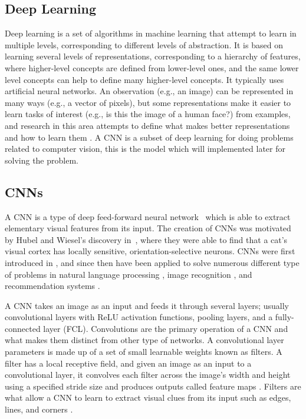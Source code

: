 \subsection{Deep Learning}
Deep learning is a set of algorithms in machine learning that attempt to learn in multiple levels, corresponding to different levels of abstraction. It is based on learning several levels of representations, corresponding to a hierarchy of features, where higher-level concepts are defined from lower-level ones, and the same lower level concepts can help to define many higher-level concepts. It typically uses artificial neural networks. An observation (e.g., an image) can be represented in many ways (e.g., a vector of pixels), but some representations make it easier to learn tasks of interest (e.g., is this the image of a human face?) from examples, and research in this area attempts to define what makes better representations and how to learn them \cite{DeepLearning}. A CNN is a subset of deep learning for doing problems related to computer vision, this is the model which will implemented later for solving the problem.

\subsection{CNNs}

A CNN is a type of deep feed-forward neural network~\cite{cnn-star-galaxy} which is able to extract elementary visual features from its input. The creation of CNNs was motivated by Hubel and Wiesel's discovery in~\cite{hubel-wiesel-receptive-fields}, where they were able to find that a cat's visual cortex has locally sensitive, orientation-selective neurons. CNNs were first introduced in \citeyear{Lecun99objectrecognition} \cite{Lecun99objectrecognition}, and since then have been applied to solve numerous different type of problems in  natural language processing \cite{Collobert:2008:UAN:1390156.1390177}, image recognition \cite{cnn-star-galaxy}, and recommendation systems \cite{NIPS2013_5004}.

A CNN takes an image as an input and feeds it through several layers; usually convolutional layers with ReLU activation functions, pooling layers, and a fully-connected layer (FCL). Convolutions are the primary operation of a CNN and what makes them distinct from other type of networks. A convolutional layer parameters is made up of a set of small learnable weights known as filters. A filter has a local receptive field, and given an image as an input to a convolutional layer, it convolves each filter across the image's width and height using a specified stride size and produces outputs called feature maps \cite{cnn-star-galaxy}. Filters are what allow a CNN to learn to extract visual clues from its input such as edges, lines, and corners \cite{Lecun99objectrecognition}.

